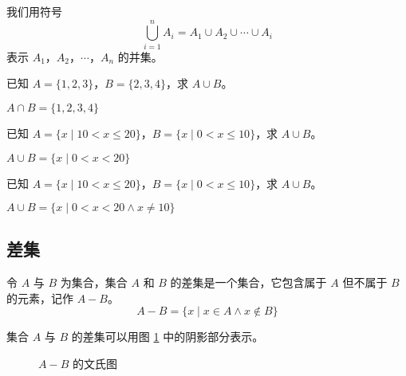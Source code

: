 \documentclass[lang=cn, chinesefont=founder, color=cyan, citestyle=gb7714-2015, bibstyle=gb7714-2015]{elegantbook}
\newcommand{\spare}{\vspace{-1em}\begin{center}\color{structurecolor}\hdashrule[0.5ex]{\textwidth}{1pt}{1pt}\end{center}\vspace{-1em}}
\begin{document}
我们用符号
\begin{equation*}
    \bigcup_{i=1}^n A_i=A_1 \cup A_2 \cup \cdots \cup A_i
\end{equation*}
表示 $A_1$，$A_2$，$\cdots$，$A_n$ 的并集。
\begin{collections}
    \begin{example}
        已知 $A = \{ 1, 2, 3 \}$，$B = \{ 2, 3, 4\}$，求 $A \cup B$。
    \end{example}
    \begin{solution}
        $A \cap B = \{1, 2, 3, 4\}$
    \end{solution}

    \spare

    \begin{example}
        已知 $A = \{ x \mid 10 < x \leq 20 \}$，$B = \{ x \mid 0 < x \leq 10 \}$，求 $A \cup B$。
    \end{example}
    \begin{solution}
        $A \cup B = \{ x \mid 0 < x < 20\}$
    \end{solution}

    \spare

    \begin{example}
        已知 $A = \{ x \mid 10 < x \leq 20 \}$，$B = \{ x \mid 0 < x \leq 10 \}$，求 $A \cup B$。
    \end{example}
    \begin{solution}
        $A \cup B = \{ x \mid 0 < x < 20 \land x \neq 10 \}$
    \end{solution}
\end{collections}

\subsection{差集}
\begin{definition}[集合的差集]\label{def:差集}
    令 $A$ 与 $B$ 为集合，集合 $A$ 和 $B$ 的差集是一个集合，它包含属于 $A$ 但不属于 $B$ 的元素，记作 $A-B$。
    \begin{equation*}
        A - B = \{ x \mid x \in A \land x \notin B \}
    \end{equation*}
\end{definition}

集合 $A$ 与 $B$ 的差集可以用图 \ref{fig:差集文氏图} 中的阴影部分表示。
\begin{figure}[htbp!]
    \centering
    \caption{$A - B$ 的文氏图}
    \label{fig:差集文氏图}
\end{figure}
\end{document}
